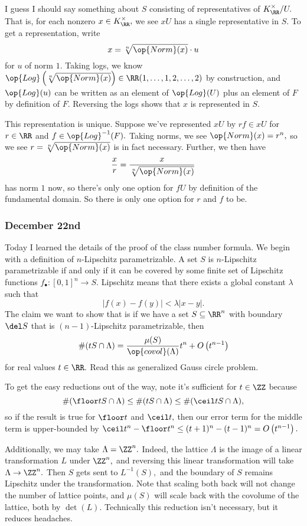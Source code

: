 I guess I should say something about $S$ consisting of representatives of $K_\RR^\times/U.$ That is, for each nonzero $x\in K_\RR^\times,$ we see $xU$ has a single representative in $S.$ To get a representation, write
\[x=\sqrt[n]{\op{Norm}(x)}\cdot u\]
for $u$ of norm $1.$ Taking logs, we know $\op{Log}\left(\sqrt[n]{\op{Norm}(x)}\right)\in\RR(1,\ldots,1,2,\ldots,2)$ by construction, and $\op{Log}(u)$ can be written as an element of $\op{Log}(U)$ plus an element of $F$ by definition of $F.$ Reversing the logs shows that $x$ is represented in $S.$

This representation is unique. Suppose we've represented $xU$ by $rf\in xU$ for $r\in\RR$ and $f\in\op{Log}^{-1}(F).$ Taking norms, we see $\op{Norm}(x)=r^n,$ so we see $r=\sqrt[n]{\op{Norm}(x)}$ is in fact necessary. Further, we then have
\[\frac xr=\frac x{\sqrt[n]{\op{Norm}(x)}}\]
has norm $1$ now, so there's only one option for $fU$ by definition of the fundamental domain. So there is only one option for $r$ and $f$ to be.

\subsubsection{December 22nd}
Today I learned the details of the proof of the class number formula. We begin with a definition of $n$-Lipschitz parametrizable. A set $S$ is $n$-Lipschitz parametrizable if and only if it can be covered by some finite set of Lipschitz functions $f_\bullet:[0,1]^n\to S.$ Lipschitz means that there exists a global constant $\lambda$ such that
\[|f(x)-f(y)|<\lambda|x-y|.\]
The claim we want to show that is if we have a set $S\subseteq\RR^n$ with boundary $\del S$ that is $(n-1)$-Lipschitz parametrizable, then
\[\#(tS\cap\Lambda)=\frac{\mu(S)}{\op{covol}(\Lambda)}t^n+O\left(t^{n-1}\right)\]
for real values $t\in\RR.$ Read this as generalized Gauss circle problem.

To get the easy reductions out of the way, note it's sufficient for $t\in\ZZ$ because
\[\#(\floor tS\cap\Lambda)\le\#(tS\cap\Lambda)\le\#(\ceil tS\cap\Lambda),\]
so if the result is true for $\floor t$ and $\ceil t,$ then our error term for the middle term is upper-bounded by $\ceil t^n-\floor t^n\le(t+1)^n-(t-1)^n=O\left(t^{n-1}\right).$ 

Additionally, we may take $\Lambda=\ZZ^n.$ Indeed, the lattice $\Lambda$ is the image of a linear transformation $L$ under $\ZZ^n,$ and reversing this linear transformation will take $\Lambda\to\ZZ^n.$ Then $S$ gets sent to $L^{-1}(S),$ and the boundary of $S$ remains Lipschitz under the transformation. Note that scaling both back will not change the number of lattice points, and $\mu(S)$ will scale back with the covolume of the lattice, both by $\det(L).$ Technically this reduction isn't necessary, but it reduces headaches.

